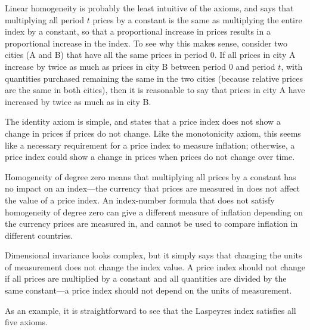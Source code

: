 \documentclass[]{article}
\begin{document}
Linear homogeneity is probably the least intuitive of the axioms, and says that multiplying all period \(t\) prices by a constant is the same as multiplying the entire index by a constant, so that a proportional increase in prices results in a proportional increase in the index. To see why this makes sense, consider two cities (A and B) that have all the same prices in period 0. If all prices in city A increase by twice as much as prices in city B between period 0 and period \(t\), with quantities purchased remaining the same in the two cities (because relative prices are the same in both cities), then it is reasonable to say that prices in city A have increased by twice as much as in city B.

The identity axiom is simple, and states that a price index does not show a change in prices if prices do not change. Like the monotonicity axiom, this seems like a necessary requirement for a price index to measure inflation; otherwise, a price index could show a change in prices when prices do not change over time.

Homogeneity of degree zero means that multiplying all prices by a constant has no impact on an index---the currency that prices are measured in does not affect the value of a price index. An index-number formula that does not satisfy homogeneity of degree zero can give a different measure of inflation depending on the currency prices are measured in, and cannot be used to compare inflation in different countries.

Dimensional invariance looks complex, but it simply says that changing the units of measurement does not change the index value. A price index should not change if all prices are multiplied by a constant and all quantities are divided by the same constant---a price index should not depend on the units of measurement.

As an example, it is straightforward to see that the Laspeyres index satisfies all five axioms.
\end{document}
